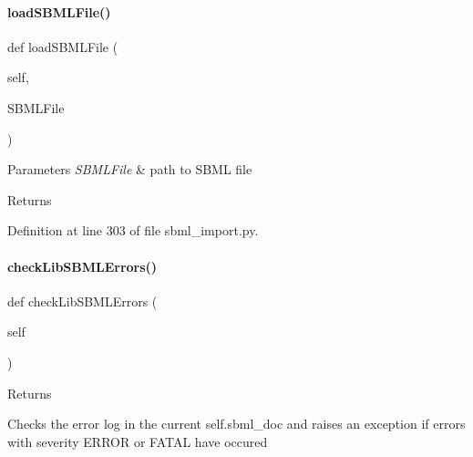\paragraph{\texorpdfstring{load\+S\+B\+M\+L\+File()}{loadSBMLFile()}}
{\footnotesize\ttfamily def load\+S\+B\+M\+L\+File (\begin{DoxyParamCaption}\item[{}]{self,  }\item[{}]{S\+B\+M\+L\+File }\end{DoxyParamCaption})}


\begin{DoxyParams}{Parameters}
{\em S\+B\+M\+L\+File} & path to S\+B\+ML file\\
\hline
\end{DoxyParams}
\begin{DoxyReturn}{Returns}

\end{DoxyReturn}


Definition at line 303 of file sbml\+\_\+import.\+py.

\mbox{\label{classamici_1_1sbml__import_1_1_sbml_importer_a0dcfa882a6a14f2d4b83e11552aae318}} 
\paragraph{\texorpdfstring{check\+Lib\+S\+B\+M\+L\+Errors()}{checkLibSBMLErrors()}}
{\footnotesize\ttfamily def check\+Lib\+S\+B\+M\+L\+Errors (\begin{DoxyParamCaption}\item[{}]{self }\end{DoxyParamCaption})}

\begin{DoxyReturn}{Returns}

\end{DoxyReturn}
\begin{DoxyVerb}        Checks the error log in the current self.sbml_doc and raises an exception if errors with severity ERROR
        or FATAL have occured\end{DoxyVerb}
 

